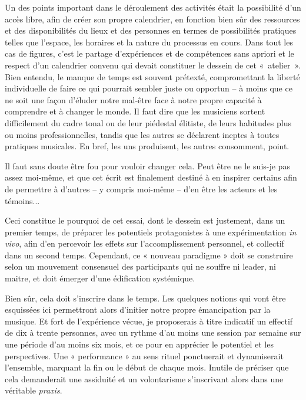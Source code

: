 \documentclass{article}
\begin{document}
Un des points important dans le déroulement des activités était la possibilité d’un accès libre, afin de créer son propre calendrier, en fonction bien sûr des ressources et des disponibilités du lieux et des personnes en termes de possibilités pratiques telles que l’espace, les horaires et la nature du processus en cours. Dans tout les cas de figures, c’est le partage d’expériences et de compétences sans apriori et le respect d'un calendrier convenu qui devait constituer le dessein de cet \hbox{« atelier »}. Bien entendu, le manque de temps est souvent prétexté, compromettant la liberté individuelle de faire ce qui pourrait sembler juste ou opportun -- à moins que ce ne soit une façon d'éluder notre mal-être face à notre propre capacité à comprendre et à changer le monde.
Il faut dire que les musiciens sortent difficilement du cadre tonal ou de leur piédestal élitiste, de leurs habitudes plus ou moins professionnelles, tandis que les autres se déclarent ineptes à toutes pratiques musicales. En bref, les uns produisent, les autres consomment, point. 

Il faut sans doute être fou pour vouloir changer cela. Peut être ne le suis-je pas assez moi-même, et que cet écrit est finalement destiné à en inspirer certains afin de permettre à d'autres -- y compris moi-même -- d'en être les acteurs et les témoins...

\bigskip
Ceci constitue le pourquoi de cet essai, dont le dessein est justement, dans un premier temps, de préparer les potentiels protagonistes à une expérimentation \textit{in vivo}, afin d'en percevoir les effets sur l'accomplissement personnel, et collectif dans un second temps. Cependant, ce « nouveau paradigme » doit se construire selon un mouvement consensuel des participants qui ne souffre ni leader, ni  maitre, et doit émerger d'une édification systémique. 

Bien sûr, cela doit s'inscrire dans le temps. Les quelques notions qui vont être esquissées ici permettront alors d'initier notre propre émancipation par la musique. 
Et fort de l'expérience vécue, je proposerais à titre indicatif un effectif de dix à trente personnes, avec un rythme d'au moins une session par semaine sur une période d'au moins six mois, et ce pour en apprécier le potentiel et les perspectives. 
Une « performance » au sens rituel ponctuerait et dynamiserait l'ensemble, marquant la fin ou le début de chaque mois. Inutile de préciser que cela demanderait une assiduité et un volontarisme s'inscrivant alors dans une véritable \textit{praxis}. 
\end{document}
